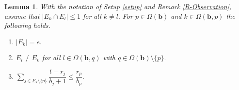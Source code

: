 \documentclass[12pt,reqno]{amsart}
\newtheorem{lemma}[thm]{Lemma}
\theoremstyle{definition}
\newcommand{\bb}{\mathbf{b}}
\newcommand{\Om}{\Omega}
\numberwithin{equation}{section}
\begin{document}
\begin{lemma}\label{L-Tool02}
    With the notation of Setup \ref{setup} and Remark \ref{R-Observation}, assume that $|E_k \cap E_l| \le 1$ for all $k \ne l.$ For $p \in \Om(\bb)$ and $k \in \Om(\bb, p)$ the following holds.  
   
    \begin{enumerate}[\rm(i)]
        \item $|E_k| = e.$
        \item $E_l \ne E_k$ for all $l \in \Om(\bb, q)$ with $q \in \Om(\bb) \setminus \{p\}.$ 
        
        
        
      

        \vspace{2.5mm}
        
        \item  
        $\sum\limits_{j \in E_k \setminus \{p\}} \dfrac{t - r_j}{b_j + 1} \le \dfrac{r_p}{b_p}.$
        
    \end{enumerate}
\end{lemma}
\end{document}
